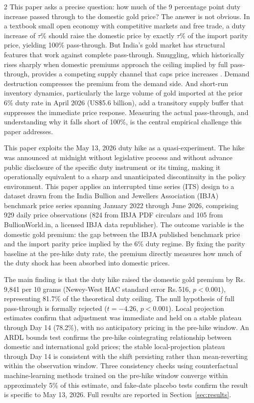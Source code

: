 \documentclass[12pt]{article}
\begin{document}
\begin{multicols}{2}
This paper asks a precise question: how much of the 9 percentage point duty increase passed through to the domestic gold price? The answer is not obvious. In a textbook small open economy with competitive markets and free trade, a duty increase of $\tau$\% should raise the domestic price by exactly $\tau$\% of the import parity price, yielding 100\% pass-through. But India's gold market has structural features that work against complete pass-through. Smuggling, which historically rises sharply when domestic premiums approach the ceiling implied by full pass-through, provides a competing supply channel that caps price increases \citep{GoldSmuggling2024}. Demand destruction compresses the premium from the demand side. And short-run inventory dynamics, particularly the large volume of gold imported at the prior 6\% duty rate in April 2026 (US\$5.6 billion), add a transitory supply buffer that suppresses the immediate price response. Measuring the actual pass-through, and understanding why it falls short of 100\%, is the central empirical challenge this paper addresses.

This paper exploits the May 13, 2026 duty hike as a quasi-experiment. The hike was announced at midnight without legislative process and without advance public disclosure of the specific duty instrument or its timing, making it operationally equivalent to a sharp and unanticipated discontinuity in the policy environment. This paper applies an interrupted time series (ITS) design to a dataset drawn from the India Bullion and Jewellers Association (IBJA) benchmark price series spanning January 2022 through June 2026, comprising 929 daily price observations (824 from IBJA PDF circulars and 105 from BullionWorld.in, a licensed IBJA data republisher). The outcome variable is the domestic gold premium: the gap between the IBJA published benchmark price and the import parity price implied by the 6\% duty regime. By fixing the parity baseline at the pre-hike duty rate, the premium directly measures how much of the duty shock has been absorbed into domestic prices.

The main finding is that the duty hike raised the domestic gold premium by Rs.\,9,841 per 10 grams (Newey-West HAC standard error Rs.\,516, $p < 0.001$), representing 81.7\% of the theoretical duty ceiling. The null hypothesis of full pass-through is formally rejected ($t = -4.26$, $p < 0.001$). Local projection estimates \citep{Jorda2005} confirm that adjustment was immediate and held on a stable plateau through Day 14 (78.2\%), with no anticipatory pricing in the pre-hike window. An ARDL bounds test \citep{Pesaran2001} confirms the pre-hike cointegrating relationship between domestic and international gold prices; the stable local-projection plateau through Day 14 is consistent with the shift persisting rather than mean-reverting within the observation window. Three consistency checks using counterfactual machine-learning methods trained on the pre-hike window converge within approximately 5\% of this estimate, and fake-date placebo tests confirm the result is specific to May 13, 2026. Full results are reported in Section~\ref{sec:results}.


\end{multicols}
\end{document}
